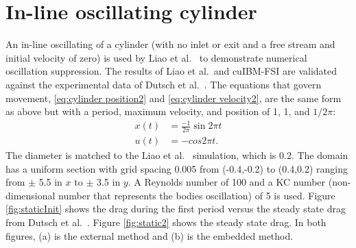 \section{In-line oscillating cylinder}
\label{sec:Oscillating Cylinder in no Flow}
An in-line oscillating of a cylinder (with no inlet or exit and a free stream and initial velocity of zero) is used by Liao et al.~\cite{liao2010simulating} to demonstrate numerical oscillation suppression. 
The results of Liao et al.~and cuIBM-FSI are validated against the experimental data of Dutsch et al.~\cite{dutsch1998low}. 
The equations that govern movement, \eqref{eq:cylinder position2} and \eqref{eq:cylinder velocity2}, are the same form as above but with a period, maximum velocity, and position of 1, 1, and $1/2\pi$:
\begin{align}
x(t)&=\frac{-1}{2\pi}\sin{2\pi t}\label{eq:cylinder position2}\\
u(t)&=-cos{2\pi t}.\;\label{eq:cylinder velocity2}
\end{align}
The diameter is matched to the Liao et al.~\cite{liao2010simulating} simulation, which is 0.2. 
The domain has a uniform section with grid spacing 0.005 from (-0.4,-0.2) to (0.4,0.2) ranging from $\pm$ 5.5 in $x$ to $\pm$ 3.5 in $y$. 
A Reynolds number of 100 and a KC number (non-dimensional number that represents the bodies oscillation) of 5 is used.
Figure \ref{fig:staticInit} shows the drag during the first period versus the steady state drag from Dutsch et al.~\cite{dutsch1998low}. 
Figure \ref{fig:static2} shows the steady state drag. 
In both figures, (a) is the external method and (b) is the embedded method.
